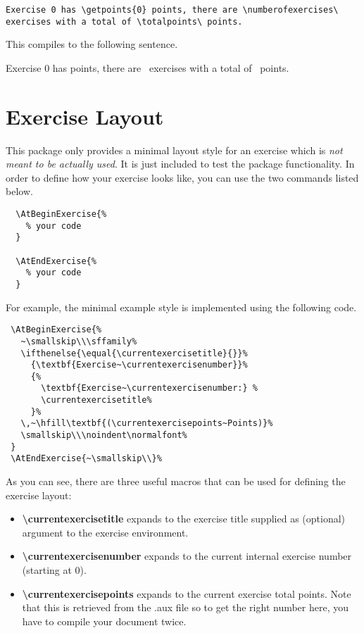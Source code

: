 \documentclass[
  twocolumn,%
  fontsize=9pt,%
  DIV=calc,%
  numbers=noendperiod%
]{scrartcl}
\begin{document}
\begin{lstlisting}[emph={numberofexercises,totalpoints,getpoints}]
  Exercise 0 has \getpoints{0} points, there are \numberofexercises\ exercises with a total of \totalpoints\ points.
\end{lstlisting}

\noindent This compiles to the following sentence.\smallskip

Exercise 0 has  points, there are \numberofexercises\ exercises with a total of \totalpoints\ points.


\section{Exercise Layout}
This package only provides a minimal layout style for an exercise which is \emph{not meant to be actually used}. It is just included to test the package functionality. In order to define how your exercise looks like, you can use the two commands listed below.
\begin{lstlisting}
  \AtBeginExercise{%
    % your code
  }

  \AtEndExercise{%
    % your code
  }
\end{lstlisting}
For example, the minimal example style is implemented using the following code.
\begin{lstlisting}
 \AtBeginExercise{%
   ~\smallskip\\\sffamily%
   \ifthenelse{\equal{\currentexercisetitle}{}}%
     {\textbf{Exercise~\currentexercisenumber}}%
     {%
       \textbf{Exercise~\currentexercisenumber:} %
       \currentexercisetitle%
     }%
   \,~\hfill\textbf{(\currentexercisepoints~Points)}%
   \smallskip\\\noindent\normalfont%
 }
 \AtEndExercise{~\smallskip\\}%
\end{lstlisting}
As you can see, there are three useful macros that can be used for defining the exercise layout:
\begin{itemize}
  \item \textcolor{NavyBlue}{\ttfamily\bfseries\textbackslash currentexercisetitle} expands to the exercise title supplied as (optional) argument to the exercise environment.
  \item \textcolor{NavyBlue}{\ttfamily\bfseries\textbackslash currentexercisenumber} expands to the current internal exercise number (starting at $0$). 
  \item \textcolor{NavyBlue}{\ttfamily\bfseries\textbackslash currentexercisepoints} expands to the current exercise total points. Note that this is retrieved from the .aux file so to get the right number here, you have to compile your document twice.
\end{itemize}
\end{document}
